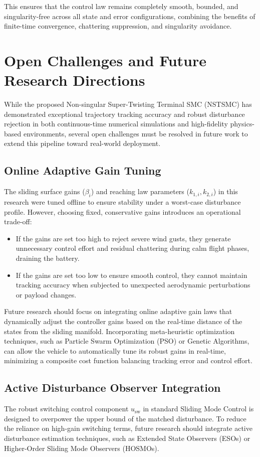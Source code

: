 This ensures that the control law remains completely smooth, bounded, and singularity-free across all state and error configurations, combining the benefits of finite-time convergence, chattering suppression, and singularity avoidance.

\section{Open Challenges and Future Research Directions}
While the proposed Non-singular Super-Twisting Terminal SMC (NSTSMC) has demonstrated exceptional trajectory tracking accuracy and robust disturbance rejection in both continuous-time numerical simulations and high-fidelity physics-based environments, several open challenges must be resolved in future work to extend this pipeline toward real-world deployment.

\subsection{Online Adaptive Gain Tuning}
The sliding surface gains ($\beta_i$) and reaching law parameters ($k_{1,i}, k_{2,i}$) in this research were tuned offline to ensure stability under a worst-case disturbance profile. However, choosing fixed, conservative gains introduces an operational trade-off:
\begin{itemize}
    \item If the gains are set too high to reject severe wind gusts, they generate unnecessary control effort and residual chattering during calm flight phases, draining the battery.
    \item If the gains are set too low to ensure smooth control, they cannot maintain tracking accuracy when subjected to unexpected aerodynamic perturbations or payload changes.
\end{itemize}
Future research should focus on integrating online adaptive gain laws that dynamically adjust the controller gains based on the real-time distance of the states from the sliding manifold. Incorporating meta-heuristic optimization techniques, such as Particle Swarm Optimization (PSO) or Genetic Algorithms, can allow the vehicle to automatically tune its robust gains in real-time, minimizing a composite cost function balancing tracking error and control effort.

\subsection{Active Disturbance Observer Integration}
The robust switching control component $u_{\text{sw}}$ in standard Sliding Mode Control is designed to overpower the upper bound of the matched disturbance. To reduce the reliance on high-gain switching terms, future research should integrate active disturbance estimation techniques, such as Extended State Observers (ESOs) or Higher-Order Sliding Mode Observers (HOSMOs). 

